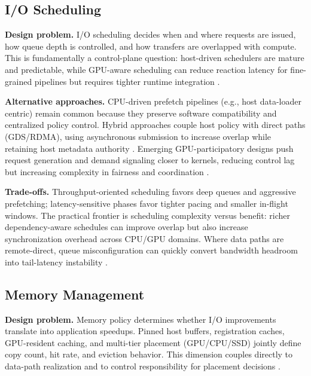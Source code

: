 \subsection{I/O Scheduling}

\textbf{Design problem.} I/O scheduling decides when and where requests are issued, how queue depth is controlled, and how transfers are overlapped with compute. This is fundamentally a control-plane question: host-driven schedulers are mature and predictable, while GPU-aware scheduling can reduce reaction latency for fine-grained pipelines but requires tighter runtime integration \cite{linux_io_uring,spdk_overview,silberstein2013gpufs}.

\textbf{Alternative approaches.} CPU-driven prefetch pipelines (e.g., host data-loader centric) remain common because they preserve software compatibility and centralized policy control. Hybrid approaches couple host policy with direct paths (GDS/RDMA), using asynchronous submission to increase overlap while retaining host metadata authority \cite{nvidia_gds_blog,nvidia_gds_overview,nvidia_gdrdma}. Emerging GPU-participatory designs push request generation and demand signaling closer to kernels, reducing control lag but increasing complexity in fairness and coordination \cite{qureshi2023bam,geminifs2025}.

\textbf{Trade-offs.} Throughput-oriented scheduling favors deep queues and aggressive prefetching; latency-sensitive phases favor tighter pacing and smaller in-flight windows. The practical frontier is scheduling complexity versus benefit: richer dependency-aware schedules can improve overlap but also increase synchronization overhead across CPU/GPU domains. Where data paths are remote-direct, queue misconfiguration can quickly convert bandwidth headroom into tail-latency instability \cite{nvmeof_spec,infiniband_spec,liu2017rackscale}.

\subsection{Memory Management}

\textbf{Design problem.} Memory policy determines whether I/O improvements translate into application speedups. Pinned host buffers, registration caches, GPU-resident caching, and multi-tier placement (GPU/CPU/SSD) jointly define copy count, hit rate, and eviction behavior. This dimension couples directly to data-path realization and to control responsibility for placement decisions \cite{nvidia_gds_best_practices,nvidia_gdrdma,rajbhandari2021zeroinfinity}.

